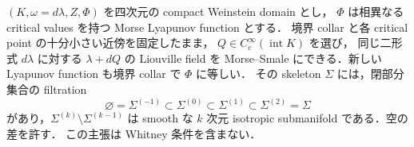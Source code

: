 \begin{lemma}
\label{ke:compact-relative-morse-smale}
$(K,\omega=d\lambda,Z,\Phi)$ を四次元の compact Weinstein domain とし，
$\Phi$ は相異なる critical values を持つ Morse Lyapunov function とする．
境界 collar と各 critical point の十分小さい近傍を固定したまま，
$Q\in C_c^\infty(\operatorname{int}K)$ を選び，
同じ二形式 $d\lambda$ に対する $\lambda+dQ$ の Liouville field を
Morse--Smale にできる．新しい Lyapunov function も境界 collar で $\Phi$ に等しい．
その skeleton $\Sigma$ には，閉部分集合の filtration
\[
 \varnothing=\Sigma^{(-1)}\subset\Sigma^{(0)}
 \subset\Sigma^{(1)}\subset\Sigma^{(2)}=\Sigma
\]
があり，$\Sigma^{(k)}\setminus\Sigma^{(k-1)}$ は smooth な
$k$ 次元 isotropic submanifold である．空の差を許す．
この主張は Whitney 条件を含まない．
\end{lemma}

